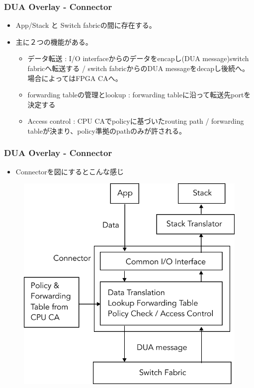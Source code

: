 \documentclass[dvipdfmx,9pt,notheorems]{beamer}
\theoremstyle{definition}
\begin{document}
%
\begin{frame}\frametitle{DUA Overlay - Connector}
	\begin{itemize}
		\item App/Stack と Switch fabricの間に存在する。
		\item 主に２つの機能がある。
			\begin{itemize}
				\item データ転送 : I/O interfaceからのデータをencapし(DUA message)switch fabricへ転送する / switch fabricからのDUA messageをdecapし後続へ。場合によってはFPGA CAへ。
				\item forwarding tableの管理とlookup : forwarding tableに沿って転送先portを決定する
				\item Access control : CPU CAでpolicyに基づいたrouting path / forwarding tableが決まり、policy準拠のpathのみが許される。
			\end{itemize}
	\end{itemize}
\end{frame}


\begin{frame}\frametitle{DUA Overlay - Connector}
	\begin{itemize}
		\item Connectorを図にするとこんな感じ
		\end{itemize}
  \begin{figure}[htb]
		\includegraphics[scale=0.5]{fig/ez_DUA_DataPlane_Connector.pdf}
  \end{figure}
\pnote{
}
\end{frame}
\end{document}
